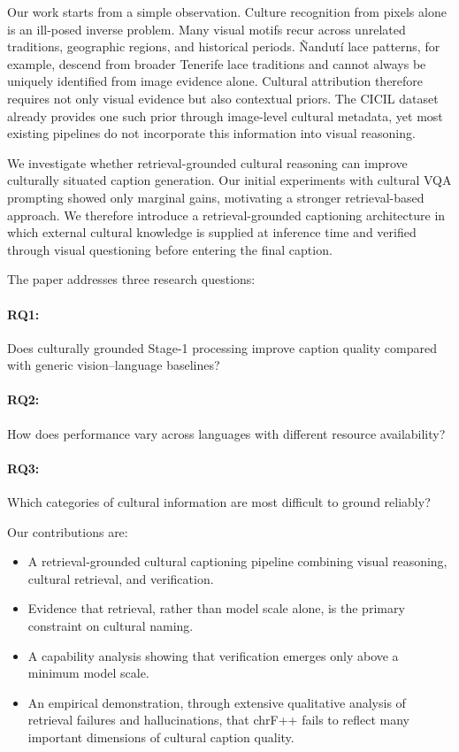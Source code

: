 \documentclass[11pt]{article}
\begin{document}
Our work starts from a simple observation. Culture recognition from pixels
alone is an ill-posed inverse problem. Many visual motifs recur across
unrelated traditions, geographic regions, and historical periods. Ñandutí
lace patterns, for example, descend from broader Tenerife lace traditions and
cannot always be uniquely identified from image evidence alone. Cultural
attribution therefore requires not only visual evidence but also contextual
priors. The CICIL dataset already provides one such prior through image-level
cultural metadata, yet most existing pipelines do not incorporate this
information into visual reasoning.

We investigate whether retrieval-grounded cultural reasoning can improve
culturally situated caption generation. Our initial experiments with cultural
VQA prompting showed only marginal gains, motivating a stronger
retrieval-based approach. We therefore introduce a retrieval-grounded
captioning architecture in which external cultural knowledge is supplied at
inference time and verified through visual questioning before entering the
final caption.

The paper addresses three research questions:

\paragraph{RQ1:} Does culturally grounded Stage-1 processing improve caption
quality compared with generic vision--language baselines?
\paragraph{RQ2:} How does performance vary across languages with different
resource availability?
\paragraph{RQ3:} Which categories of cultural information are most difficult
to ground reliably?

Our contributions are:
\begin{itemize}
  \item A retrieval-grounded cultural captioning pipeline combining visual
    reasoning, cultural retrieval, and verification.
  \item Evidence that retrieval, rather than model scale alone, is the
    primary constraint on cultural naming.
  \item A capability analysis showing that verification emerges only above a
    minimum model scale.
  \item An empirical demonstration, through extensive qualitative analysis
    of retrieval failures and hallucinations, that chrF++ fails to reflect
    many important dimensions of cultural caption quality.
\end{itemize}
\end{document}

